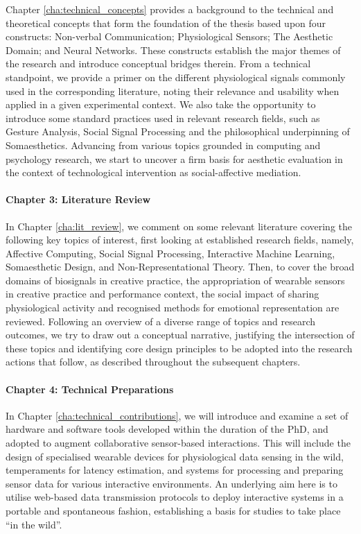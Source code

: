 Chapter \ref{cha:technical_concepts} provides a background to the technical and theoretical concepts that form the foundation of the thesis based upon four constructs: Non-verbal Communication; Physiological Sensors; The Aesthetic Domain; and Neural Networks. These constructs establish the major themes of the research and introduce conceptual bridges therein. From a technical standpoint, we provide a primer on the different physiological signals commonly used in the corresponding literature, noting their relevance and usability when applied in a given experimental context. We also take the opportunity to introduce some standard practices used in relevant research fields, such as Gesture Analysis, Social Signal Processing and the philosophical underpinning of Somaesthetics. Advancing from various topics grounded in computing and psychology research, we start to uncover a firm basis for aesthetic evaluation in the context of technological intervention as social-affective mediation.

\paragraph{Chapter 3: Literature Review}

In Chapter \ref{cha:lit_review}, we comment on some relevant literature covering the following key topics of interest, first looking at established research fields, namely, Affective Computing, Social Signal Processing, Interactive Machine Learning, Somaesthetic Design, and Non-Representational Theory. Then, to cover the broad domains of biosignals in creative practice, the appropriation of wearable sensors in creative practice and performance context, the social impact of sharing physiological activity and recognised methods for emotional representation are reviewed. Following an overview of a diverse range of topics and research outcomes, we try to draw out a conceptual narrative, justifying the intersection of these topics and identifying core design principles to be adopted into the research actions that follow, as described throughout the subsequent chapters.

\paragraph{Chapter 4: Technical Preparations}

In Chapter \ref{cha:technical_contributions}, we will introduce and examine a set of hardware and software tools developed within the duration of the PhD, and adopted to augment collaborative sensor-based interactions. This will include the design of specialised wearable devices for physiological data sensing in the wild, temperaments for latency estimation, and systems for processing and preparing sensor data for various interactive environments. An underlying aim here is to utilise web-based data transmission protocols to deploy interactive systems in a portable and spontaneous fashion, establishing a basis for studies to take place ``in the wild''.

